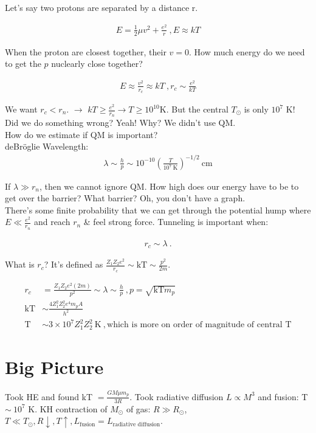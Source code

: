 \documentclass[10pt,letterpaper,final]{book}
\newcommand{\pt}{\propto}
\newcommand{\ra}{\rightarrow}
\begin{document}
Let's say two protons are separated by a distance r.

\begin{align}
E = \frac{1}{2} \mu v^2 + \frac{e^2}{r}~, E \approx kT
\end{align}

When the proton are closest together, their $v=0$. How much energy do we need to get the $p$ nuclearly close together? 

\begin{align}
E \approx \frac{v^2}{r_c} \approx kT~, r_c \sim \frac{e^2}{kT}
\end{align} 

We want $r_c < r_n$. $\ra$ $kT \geq \frac{e^2}{r_n} \ra T \geq 10^{10}$K. But the central $T_\odot$ is only $10^7$ K! Did we do something wrong? Yeah! Why? We didn't use QM.\\
How do we estimate if QM is important? \\

deBr\"oglie Wavelength:
\begin{align}
\lambda \sim \frac{h}{p} \sim 10^{-10} \left( \frac{T}{10^7 ~\text{K}} \right)^{-1/2}~ \text{cm}
\end{align}

If $\lambda \gg r_n$, then we cannot ignore QM. How high does our energy have to be to get over the barrier? What barrier? Oh, you don't have a graph.\\

There's some finite probability that we can get through the potential hump where $E \ll \frac{e^2}{r_n}$ and reach $r_n$ \& feel strong force. Tunneling is important when:

\begin{align}
r_c \sim \lambda ~.
\end{align}

What is $r_c$? It's defined as $\frac{Z_1 Z_2 e^2}{r_c} \sim \text{kT} \sim \frac{p^2}{2m}$. 

\begin{align}
r_c & = \frac{Z_1 Z_2 e^2 (2m)}{p^2} \sim \lambda \sim \frac{h}{p}~, p = \sqrt{\text{kT} m_p}\\
\text{kT} & \sim \frac{4 Z_1^2 Z_2^2 e^4 m_p A}{h^2}\\
\text{T} & \sim 3 \times 10^7 Z_1^2 Z_2^2 ~\text{K}~, \text{which is more on order of magnitude of central T}
\end{align}

\section{Big Picture}
Took HE and found kT $=\frac{GM \mu m_p}{3R}$. Took radiative diffusion $L \pt M^3$ and fusion: T $\sim~10^7$ K. KH contraction of $M_\odot$ of gas: $R \gg R_\odot$, $T \ll T_\odot,R \downarrow,T \uparrow, L_{\text{fusion}} = L_{\text{radiative diffusion}}$. 
\end{document}

